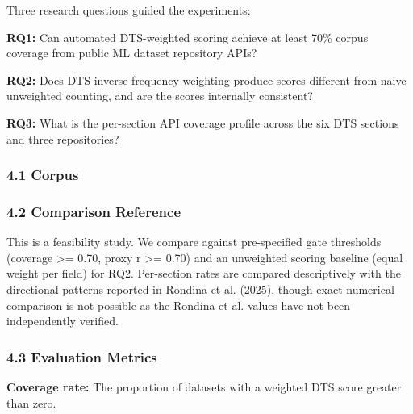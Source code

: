 
Three research questions guided the experiments:

\textbf{RQ1:} Can automated DTS-weighted scoring achieve at least 70\% corpus coverage from public ML dataset repository APIs?

\textbf{RQ2:} Does DTS inverse-frequency weighting produce scores different from naive unweighted counting, and are the scores internally consistent?

\textbf{RQ3:} What is the per-section API coverage profile across the six DTS sections and three repositories?

\subsubsection{4.1 Corpus}

\begin{table}[htbp]
\centering
{}
\end{table}

\subsubsection{4.2 Comparison Reference}

This is a feasibility study. We compare against pre-specified gate thresholds (coverage >= 0.70, proxy r >= 0.70) and an unweighted scoring baseline (equal weight per field) for RQ2. Per-section rates are compared descriptively with the directional patterns reported in Rondina et al. (2025), though exact numerical comparison is not possible as the Rondina et al. values have not been independently verified.

\subsubsection{4.3 Evaluation Metrics}

\textbf{Coverage rate:} The proportion of datasets with a weighted DTS score greater than zero.

